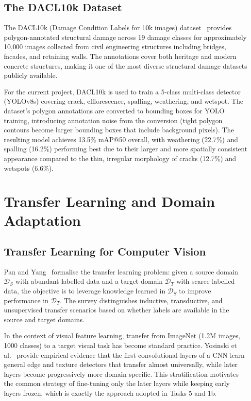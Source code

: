 \documentclass[12pt,a4paper]{article}
\begin{document}
\subsection{The DACL10k Dataset}

The DACL10k (Damage Condition Labels for 10k images) dataset~\cite{benz2022dacl10k} provides polygon-annotated structural damage across 19 damage classes for approximately 10{,}000 images collected from civil engineering structures including bridges, facades, and retaining walls. The annotations cover both heritage and modern concrete structures, making it one of the most diverse structural damage datasets publicly available.

For the current project, DACL10k is used to train a 5-class multi-class detector (YOLOv8s) covering crack, efflorescence, spalling, weathering, and wetspot. The dataset's polygon annotations are converted to bounding boxes for YOLO training, introducing annotation noise from the conversion (tight polygon contours become larger bounding boxes that include background pixels). The resulting model achieves 13.5\% mAP@50 overall, with weathering (22.7\%) and spalling (16.2\%) performing best due to their larger and more spatially consistent appearance compared to the thin, irregular morphology of cracks (12.7\%) and wetspots (6.6\%).

\section{Transfer Learning and Domain Adaptation}
\label{sec:transfer}

\subsection{Transfer Learning for Computer Vision}

Pan and Yang~\cite{pan2010transfer} formalise the transfer learning problem: given a source domain $\mathcal{D}_S$ with abundant labelled data and a target domain $\mathcal{D}_T$ with scarce labelled data, the objective is to leverage knowledge learned in $\mathcal{D}_S$ to improve performance in $\mathcal{D}_T$. The survey distinguishes inductive, transductive, and unsupervised transfer scenarios based on whether labels are available in the source and target domains.

In the context of visual feature learning, transfer from ImageNet (1.2M images, 1000 classes) to a target visual task has become standard practice. Yosinski et al.~\cite{yosinski2014transferable} provide empirical evidence that the first convolutional layers of a CNN learn general edge and texture detectors that transfer almost universally, while later layers become progressively more domain-specific. This stratification motivates the common strategy of fine-tuning only the later layers while keeping early layers frozen, which is exactly the approach adopted in Tasks 5 and 1b.
\end{document}
